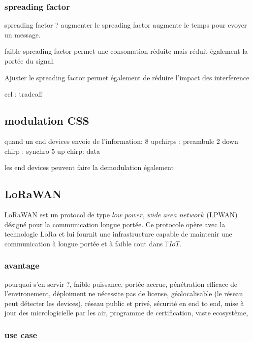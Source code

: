 \documentclass[12pt,a4paper,oneside, titlepage]{report}
\begin{document}
\subsubsection{spreading factor}

spreading factor ? augmenter le spreading factor augmente le temps pour evoyer un message.

faible spreading factor permet une consomation réduite mais réduit également la portée du signal.

Ajuster le spreading factor permet également de réduire l'impact des interference

ccl : tradeoff

\subsection{modulation CSS}

quand un end devices envoie de l'information:
8 upchirps : preambule
2 down chirp : synchro
5 up chirp: data

les end devices peuvent faire la demodulation également





\subsection{LoRaWAN}

LoRaWAN est un protocol de type $low$ $power$, $wide$ $area$ $network$ (LPWAN) désigné pour la communication longue portée. Ce protocole opère avec la technologie LoRa et lui fournit une infrastructure capable de maintenir une communication à longue portée et à faible cout dans l'$IoT$.

\subsubsection{avantage}

pourquoi s'en servir ?,
faible puissance, 
portée accrue, 
pénétration efficace de l'environement,
déploiment ne nécessite pas de license,
géolocalisable (le réseau peut détecter les devices),
réseau public et privé,
sécurité en end to end,
mise à jour des micrologicielle par les air,
programme de certification,
vaste ecosystème,

\subsubsection{use case}
\end{document}
